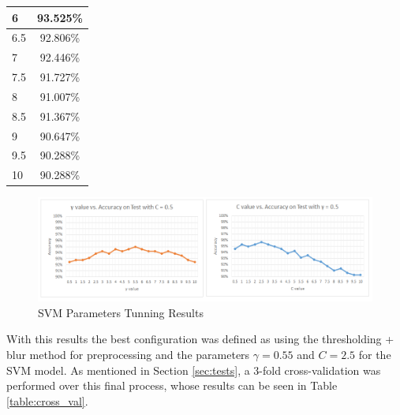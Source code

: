 \documentclass[a4paper,10pt,english]{article}
\begin{document}
\begin{minipage}{\textwidth}
\begin{minipage}[b]{0.49\textwidth}
\begin{tabular}{|l|c|}
                    6                                & 93.525\%                               \\ \hline
                    6.5                              & 92.806\%                               \\ \hline
                    7                                & 92.446\%                               \\ \hline
                    7.5                              & 91.727\%                               \\ \hline
                    8                                & 91.007\%                               \\ \hline
                    8.5                              & 91.367\%                               \\ \hline
                    9                                & 90.647\%                               \\ \hline
                    9.5                              & 90.288\%                               \\ \hline
                    10                               & 90.288\%                               \\ \hline
                \end{tabular}
            \label{tab:results_c}
        \end{minipage}
    \end{minipage}
    
    \begin{figure}[h!]
        \centering
        \includegraphics[width=500pt]{images/results_svm_parameters}
        \caption{SVM Parameters Tunning Results} \label{fig:results_svm_parameters}
    \end{figure}
    
    
    With this results the best configuration was defined as using the thresholding + blur method for preprocessing and the parameters $\gamma = 0.55$ and $C = 2.5$ for the SVM model.  As mentioned in Section \ref{sec:tests}, a 3-fold cross-validation was performed over this final process, whose results can be seen in Table \ref{table:cross_val}.
    
\end{document}
